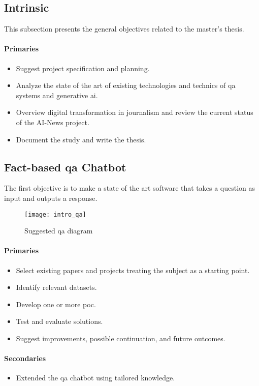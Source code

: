 \subsection*{Intrinsic}
This subsection presents the general objectives related to the master's thesis.
\paragraph{Primaries}
\begin{itemize}[noitemsep]
    \item Suggest project specification and planning.
    \item Analyze the state of the art of existing technologies and technics of \gls{qa} systems and generative \gls{ai}.
    \item Overview digital transformation in journalism and review the current status of the AI-News project.
    \item Document the study and write the thesis.
\end{itemize}

\subsection*{Fact-based \gls{qa} Chatbot}
The first objective is to make a state of the art software that takes a question as input and outputs a response.
\begin{figure}[ht!]
    \centering
    \texttt{[image: intro\_qa]}
    \caption{Suggested \gls{qa} diagram}
    \label{fig:intro_qa}
\end{figure}

\paragraph{Primaries}
\begin{itemize}[noitemsep]
    \item Select existing papers and projects treating the subject as a starting point.
    \item Identify relevant datasets.
    \item Develop one or more \gls{poc}.
    \item Test and evaluate solutions.
    \item Suggest improvements, possible continuation, and future outcomes.
\end{itemize}
\paragraph{Secondaries}
\begin{itemize}[noitemsep]
    \item Extended the \gls{qa} chatbot using tailored knowledge.
\end{itemize}

